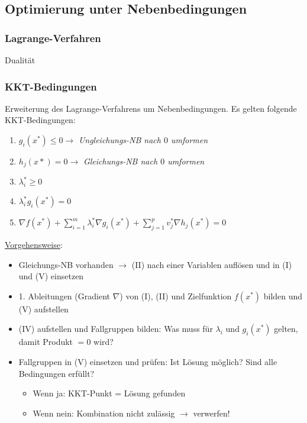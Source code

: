 \subsection{Optimierung unter Nebenbedingungen}
\subsubsection{Lagrange-Verfahren}
Dualität\\

\subsubsection{KKT-Bedingungen}
Erweiterung des Lagrange-Verfahrens um Nebenbedingungen.
Es gelten folgende KKT-Bedingungen:

\begin{enumerate}[label=(\Roman*)]
    \item \(g_i(x^*)\leq 0 \rightarrow \) \emph{Ungleichungs-NB nach \(0\) umformen}
    \item \(h_j(x*)=0 \rightarrow\) \emph{Gleichungs-NB nach \(0\) umformen}
    \item \(\lambda_i^*\geq 0\)
    \item \(\lambda_i^*g_i(x^*)=0\)
    \item $\nabla f(x^*) + \sum_{i=1}^m \lambda_i^* \nabla g_i(x^*) + \sum_{j=1}^p v_j^* \nabla h_j(x^*) = 0$\\
\end{enumerate}

\underline{Vorgehensweise}:
\begin{itemize}
    \item Gleichungs-NB vorhanden \(\rightarrow\) (II) nach einer Variablen auflösen und in (I) und (V) einsetzen
    \item 1. Ableitungen (Gradient \(\nabla\)) von (I), (II) und Zielfunktion \(f(x^*)\) bilden und (V) aufstellen
    \item (IV) aufstellen und Fallgruppen bilden: Was muss für \(\lambda_i\) und \(g_i(x^*)\) gelten, damit Produkt \(=0\) wird?
    \item Fallgruppen in (V) einsetzen und prüfen: Ist Lösung möglich? Sind alle Bedingungen erfüllt?
    \begin{itemize}
        \item Wenn ja: KKT-Punkt = Lösung gefunden
        \item Wenn nein: Kombination nicht zulässig \(\rightarrow\) verwerfen!\\
    \end{itemize}
\end{itemize}

